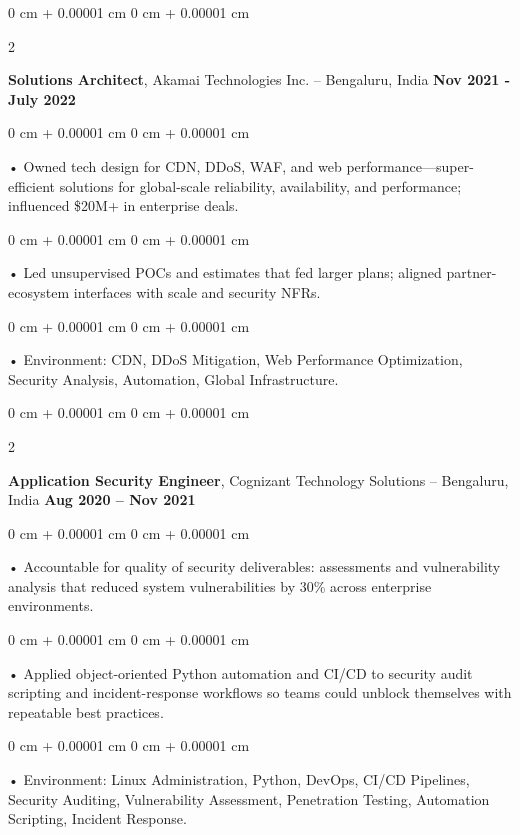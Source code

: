 \documentclass[10pt, letterpaper]{article}
\newenvironment{onecolentry}{
    \begin{adjustwidth}{
        0 cm + 0.00001 cm
    }{
        0 cm + 0.00001 cm
    }
}{
    \end{adjustwidth}
} %
\newenvironment{twocolentry}[2][]{
    \onecolentry
    \def\secondColumn{#2}
    \setcolumnwidth{\fill, 4.5 cm}
    \begin{paracol}{2}
}{
    \switchcolumn \raggedleft \secondColumn
    \end{paracol}
    \endonecolentry
} %
\begin{document}
        \begin{twocolentry}{
            \textbf{Nov 2021 - July 2022}
        }
            \textbf{Solutions Architect}, Akamai Technologies Inc. -- Bengaluru, India \end{twocolentry}
        \begin{onecolentry}
            • Owned tech design for CDN, DDoS, WAF, and web performance---super-efficient solutions for global-scale reliability, availability, and performance; influenced \$20M+ in enterprise deals.
        \end{onecolentry}
        \begin{onecolentry}
            • Led unsupervised POCs and estimates that fed larger plans; aligned partner-ecosystem interfaces with scale and security NFRs.
        \end{onecolentry}
        \begin{onecolentry}
             • Environment: CDN, DDoS Mitigation, Web Performance Optimization, Security Analysis, Automation, Global Infrastructure.
        \end{onecolentry}

        \begin{twocolentry}{
            \textbf{Aug 2020 – Nov 2021}
        }
            \vspace{2 pt }
            \textbf{Application Security Engineer}, Cognizant Technology Solutions -- Bengaluru, India\end{twocolentry}
        \begin{onecolentry}
             • Accountable for quality of security deliverables: assessments and vulnerability analysis that reduced system vulnerabilities by 30\% across enterprise environments.
        \end{onecolentry}
        \begin{onecolentry}
             • Applied object-oriented Python automation and CI/CD to security audit scripting and incident-response workflows so teams could unblock themselves with repeatable best practices.
        \end{onecolentry}
        \begin{onecolentry}
             • Environment: Linux Administration, Python, DevOps, CI/CD Pipelines, Security Auditing, Vulnerability Assessment, Penetration Testing, Automation Scripting, Incident Response.
        \end{onecolentry}
    \vspace{2 pt }
\end{document}
